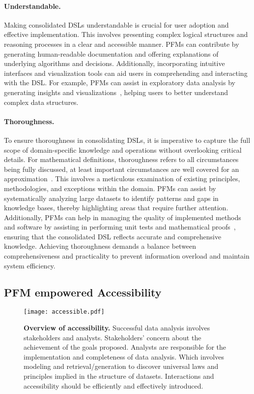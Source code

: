 \paragraph{Understandable.} Making consolidated DSLs understandable is crucial for user adoption and effective implementation. This involves presenting complex logical structures and reasoning processes in a clear and accessible manner. PFMs can contribute by generating human-readable documentation and offering explanations of underlying algorithms and decisions. Additionally, incorporating intuitive interfaces and visualization tools can aid users in comprehending and interacting with the DSL. For example, PFMs can assist in exploratory data analysis by generating insights and visualizations~\cite{ma2023insightpilot, Dibia2023LIDAAT}, helping users to better understand complex data structures.

\paragraph{Thoroughness.} To ensure thoroughness in consolidating DSLs, it is imperative to capture the full scope of domain-specific knowledge and operations without overlooking critical details. For mathematical definitions, thoroughness refers to all circumstances being fully discussed, at least important circumstances are well covered for an approximation~\cite{brand2023parameterized}. This involves a meticulous examination of existing principles, methodologies, and exceptions within the domain. PFMs can assist by systematically analyzing large datasets to identify patterns and gaps in knowledge bases, thereby highlighting areas that require further attention. Additionally, PFMs can help in managing the quality of implemented methods and software by assisting in performing unit tests and mathematical proofs~\cite{Wang2024TheoremLlamaTG, Carrott2024CoqPytPN}, ensuring that the consolidated DSL reflects accurate and comprehensive knowledge. Achieving thoroughness demands a balance between comprehensiveness and practicality to prevent information overload and maintain system efficiency.




\subsection{PFM empowered Accessibility}\label{sec:interpretability}

\begin{figure*}[h]
  \centering
  \texttt{[image: accessible.pdf]} %
  \caption{\textbf{Overview of accessibility.} Successful data analysis involves stakeholders and analysts. Stakeholders' concern about the achievement of the goals proposed. Analysts are responsible for the implementation and completeness of data analysis. Which involves modeling and retrieval/generation to discover universal laws and principles implied in the structure of datasets. Interactions and accessibility should be efficiently and effectively introduced.}
  \label{fig:accessible}
\end{figure*}

